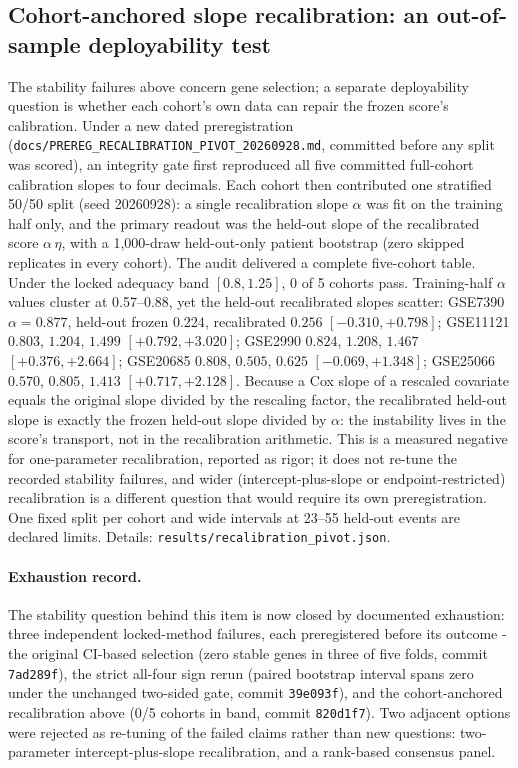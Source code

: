 \documentclass[12pt,a4paper]{article}
\begin{document}
\subsection{Cohort-anchored slope recalibration: an out-of-sample deployability test}
The stability failures above concern gene selection; a separate
deployability question is whether each cohort's own data can repair the
frozen score's calibration. Under a new dated preregistration
(\texttt{docs/PREREG\_RECALIBRATION\_PIVOT\_20260928.md}, committed
before any split was scored), an integrity gate first reproduced all five
committed full-cohort calibration slopes to four decimals. Each cohort then
contributed one stratified 50/50 split (seed 20260928): a single
recalibration slope $\alpha$ was fit on the training half only, and the
primary readout was the held-out slope of the recalibrated score
$\alpha\,\eta$, with a 1,000-draw held-out-only patient bootstrap (zero
skipped replicates in every cohort). The audit delivered a complete
five-cohort table. Under the locked adequacy band $[0.8, 1.25]$, 0 of 5
cohorts pass. Training-half $\alpha$ values cluster at 0.57--0.88, yet the
held-out recalibrated slopes scatter: GSE7390 $\alpha=0.877$, held-out
frozen $0.224$, recalibrated $0.256$ $[-0.310,+0.798]$; GSE11121 $0.803$,
$1.204$, $1.499$ $[+0.792,+3.020]$; GSE2990 $0.824$, $1.208$, $1.467$
$[+0.376,+2.664]$; GSE20685 $0.808$, $0.505$, $0.625$ $[-0.069,+1.348]$;
GSE25066 $0.570$, $0.805$, $1.413$ $[+0.717,+2.128]$. Because a Cox slope
of a rescaled covariate equals the original slope divided by the rescaling
factor, the recalibrated held-out slope is exactly the frozen held-out
slope divided by $\alpha$: the instability lives in the score's transport,
not in the recalibration arithmetic. This is a measured negative for
one-parameter recalibration, reported as rigor; it does not re-tune the
recorded stability failures, and wider (intercept-plus-slope or
endpoint-restricted) recalibration is a different question that would
require its own preregistration. One fixed split per cohort and wide
intervals at 23--55 held-out events are declared limits. Details:
\texttt{results/recalibration\_pivot.json}.

\paragraph{Exhaustion record.} The stability question behind this item is
now closed by documented exhaustion: three independent locked-method
failures, each preregistered before its outcome - the original CI-based
selection (zero stable genes in three of five folds, commit \texttt{7ad289f}),
the strict all-four sign rerun (paired bootstrap interval spans zero under
the unchanged two-sided gate, commit \texttt{39e093f}), and the
cohort-anchored recalibration above (0/5 cohorts in band, commit
\texttt{820d1f7}). Two adjacent options were rejected as re-tuning of the
failed claims rather than new questions: two-parameter intercept-plus-slope
recalibration, and a rank-based consensus panel.
\end{document}
